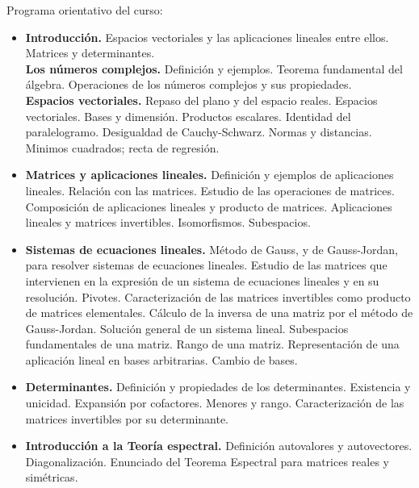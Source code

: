 \documentclass[12pt,a4paper]{amsart}
\begin{document}



\noindent\hrulefill{}  

 \noindent
{\sffamily Programa orientativo del curso:} \\
 \begin{itemize}
\item [I)] {\bf Introducci\'on.} Espacios vectoriales y las aplicaciones lineales entre ellos. Matrices y determinantes.\\
{\bf Los n\'umeros complejos.} Definici\'on y ejemplos. Teorema fundamental del \'algebra. Operaciones de los n\'umeros complejos y sus propiedades.\\
{\bf Espacios vectoriales.} Repaso del plano y del espacio reales. Espacios vectoriales. Bases y dimensi\'on. Productos escalares. Identidad del paralelogramo. Desigualdad de Cauchy-Schwarz. Normas y distancias. Minimos cuadrados; recta de regresi\'on.
\item [II)] {\bf Matrices y aplicaciones lineales.} Definici\'on y ejemplos de aplicaciones lineales. Relaci\'on con las matrices. Estudio de las operaciones de matrices. Composici\'on de aplicaciones lineales y producto de matrices. Aplicaciones lineales y matrices invertibles. Isomorfismos. Subespacios.
\item [III)] {\bf Sistemas de ecuaciones lineales.} M\'etodo de Gauss, y de Gauss-Jordan, para resolver sistemas de ecuaciones lineales. Estudio de las matrices que intervienen en la expresi\'on de un sistema de ecuaciones lineales y en su resoluci\'on. Pivotes. Caracterizaci\'on de las matrices invertibles como producto de matrices elementales. C\'alculo de la inversa de una matriz por el m\'etodo de Gauss-Jordan. Soluci\'on general de un sistema lineal. Subespacios fundamentales de una matriz. Rango de una matriz. Representaci\'on de una aplicaci\'on lineal en bases arbitrarias. Cambio de bases.
\item [IV)] {\bf Determinantes.} Definici\'on y propiedades de los determinantes. Existencia y unicidad. Expansi\'on por cofactores. Menores y rango. Caracterizaci\'on de las matrices invertibles por su determinante.
\item [V)] {\bf Introducci\'on a la Teor\'ia espectral.} Definici\'on autovalores y autovectores. Diagonalizaci\'on. Enunciado del Teorema Espectral para matrices reales y sim\'etricas.
\end{itemize}
\end{document}
